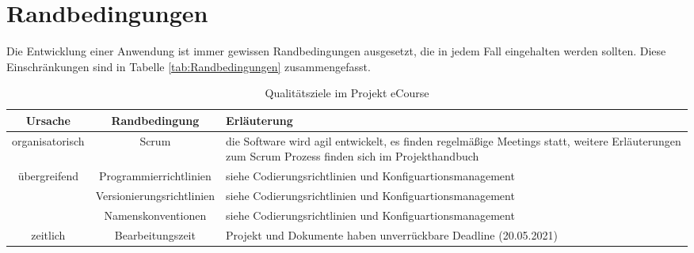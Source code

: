 
\chapter{Randbedingungen}
Die Entwicklung einer Anwendung ist immer gewissen Randbedingungen ausgesetzt, die in jedem Fall eingehalten werden sollten. Diese Einschränkungen sind in Tabelle \ref{tab:Randbedingungen} zusammengefasst. 

\begin{table}
\centering
\begin{tabularx}{\textwidth}[H]{|c|c|X|}
\hline
Ursache & Randbedingung & Erläuterung\\
\hline
organisatorisch & Scrum & die Software wird agil entwickelt, es finden regelmäßige Meetings statt, weitere Erläuterungen zum Scrum Prozess finden sich im Projekthandbuch \\
\hline
übergreifend & Programmierrichtlinien & siehe Codierungsrichtlinien und Konfiguartionsmanagement \\
\hline
\quad & Versionierungsrichtlinien & siehe Codierungsrichtlinien und Konfiguartionsmanagement \\
\hline
\quad & Namenskonventionen & siehe Codierungsrichtlinien und Konfiguartionsmanagement \\
\hline
zeitlich & Bearbeitungszeit & Projekt und Dokumente haben unverrückbare Deadline (20.05.2021)\\
\hline
\end{tabularx}
\caption{Qualitätsziele im Projekt eCourse}
\label{tab:Qualitätsziele}
\end{table}
